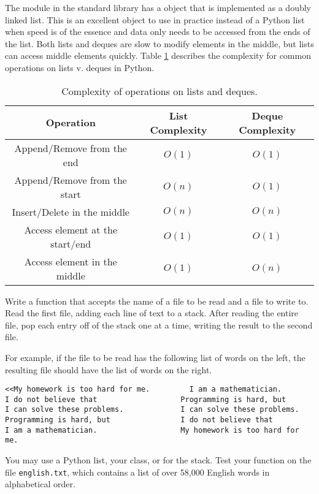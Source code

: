 The  module in the standard library has a  object that is implemented as a doubly linked list.
This is an excellent object to use in practice instead of a Python list when speed is of the essence and data only needs to be accessed from the ends of the list.
Both lists and deques are slow to modify elements in the middle, but lists can access middle elements quickly.
Table \ref{tab:list-deque-complexity} describes the complexity for common operations on lists v. deques in Python.

\begin{table}[H]
\begin{tabular}{|c|c|c|}
\hline
Operation& List Complexity & Deque Complexity\\
\hline
Append/Remove from the end& $O(1)$ & $O(1)$\\
\hline
Append/Remove from the start & \cellcolor{red!20}$O(n)$ & $O(1)$ \\
\hline
Insert/Delete in the middle   & \cellcolor{red!20}$O(n)$ & \cellcolor{red!20}$O(n)$ \\
\hline
Access element at the start/end  & $O(1)$ & $O(1)$ \\
\hline
Access element in the middle & $O(1)$ & \cellcolor{red!20}$O(n)$ \\
\hline
\end{tabular}
\caption{Complexity of operations on lists and deques.}
\label{tab:list-deque-complexity}
\end{table}

\begin{problem} %
Write a function that accepts the name of a file to be read and a file to write to.
Read the first file, adding each line of text to a stack.
After reading the entire file, pop each entry off of the stack one at a time, writing the result to the second file.

For example, if the file to be read has the following list of words on the left, the resulting file should have the list of words on the right.

\begin{lstlisting}
<<My homework is too hard for me.         I am a mathematician.
I do not believe that                   Programming is hard, but
I can solve these problems.             I can solve these problems.
Programming is hard, but                I do not believe that
I am a mathematician.                   My homework is too hard for me.
\end{lstlisting}

You may use a Python list, your  class, or  for the stack.
Test your function on the file \texttt{english.txt}, which contains a list of over 58,000 English words in alphabetical order.
\end{problem}

